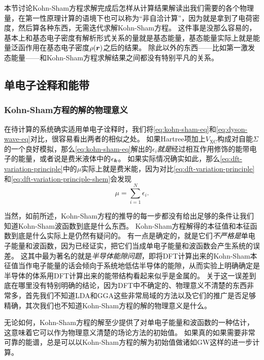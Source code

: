本节讨论Kohn-Sham方程求解完成后怎样从计算结果解读出我们需要的各个物理量，在第一性原理计算的语境下也可以称为“非自洽计算”，因为就是拿到了电荷密度，然后算各种东西，无需迭代求解Kohn-Sham方程。
这件事是没那么容易的，基本上和基态电子密度有解析形式关系的量就是基态能量，基态能量实际上就是能量泛函作用在基态电子密度$\rho(\vb*{r})$之后的结果。
除此以外的东西——比如第一激发态能量——和Kohn-Sham方程求解结果之间都没有特别平凡的关系。

\subsection{单电子诠释和能带}\label{sec:single-electron-in-dft}

\subsubsection{Kohn-Sham方程的解的物理意义}

在待计算的系统确实适用单电子诠释时，我们将\eqref{eq:kohn-sham-eq}和\eqref{eq:dyson-wave-eq}对比，很容易看出两者的相似之处。
如果Hartree项加上$V_\text{XC}$构成对自能$\Sigma$的一个良好模拟，那么\eqref{eq:kohn-sham-eq}解出的$\epsilon_i$\emph{就是}经过相互作用修饰的能带电子的能量，或者说是费米液体中的$\epsilon_{\vb*{k}}$。
如果实际情况确实如此，那么\eqref{eq:dft-variation-principle}中的$\mu$实际上就是费米能，因为对比\eqref{eq:dft-variation-principle}和\eqref{eq:dft-variation-principle-shem}会发现
\begin{equation}
    \mu = \sum_{i=1}^N \epsilon_i.
\end{equation}

当然，如前所述，Kohn-Sham方程的推导的每一步都没有给出足够的条件让我们知道Kohn-Sham波函数到底是什么东西。
Kohn-Sham方程解得的本征值和本征函数到底是什么实际上是仍然有疑问的。
有一点是确定的，就是它们\emph{不严格是}单电子能量和波函数，因为已经证实，把它们当成单电子能量和波函数会产生系统的误差。
这其中最为著名的就是\emph{半导体能隙问题}，即将DFT计算出来的Kohn-Sham本征值当作电子能量的话会倾向于系统地低估半导体的能隙，从而实验上明确确定是半导体的体系用DFT计算出来的能带结构看起来似乎是金属的。
关于这一误差到底在哪里没有特别明确的结论，因为DFT中不确定的、物理意义不清楚的东西非常多，首先我们不知道LDA和GGA这些非常局域的方法以及它们的推广是否足够精确，其次我们也不知道Kohn-Sham方程的解的物理意义是什么。

无论如何，Kohn-Sham方程的解至少提供了对单电子能量和波函数的一种估计，这意味着它可以作为物理意义清楚的场论方法的初始值。
如果真的如果需要非常可靠的能谱，总是可以以Kohn-Sham方程的解为初始值做诸如GW这样的进一步计算。

